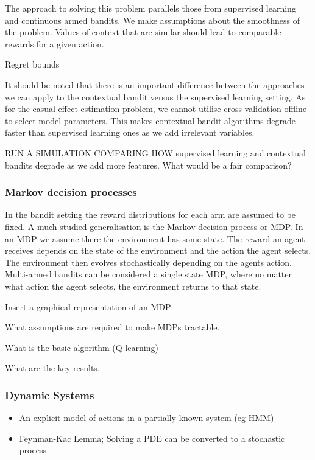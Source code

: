 \documentclass[11pt,a4paper,oneside]{book}
\theoremstyle{plain}
\theoremstyle{definition}
\begin{document}
The approach to solving this problem parallels those from supervised learning and continuous armed bandits. We make assumptions about the smoothness of the problem. Values of context that are similar should lead to comparable rewards for a given action. 

Regret bounds  

It should be noted that there is an important difference between the approaches we can apply to the contextual bandit versus the supervised learning setting. As for the casual effect estimation problem, we cannot utilise cross-validation offline to select model parameters. This makes contextual bandit algorithms degrade faster than supervised learning ones as we add irrelevant variables. 

RUN A SIMULATION COMPARING HOW supervised learning and contextual bandits degrade as we add more features. What would be a fair comparison?

\subsubsection{Markov decision processes}
In the bandit setting the reward distributions for each arm are assumed to be fixed. A much studied generalisation is the Markov decision process or MDP. In an MDP we assume there the environment has some state. The reward an agent receives depends on the state of the environment and the action the agent selects. The environment then evolves stochastically depending on the agents action. Multi-armed bandits can be considered a single state MDP, where no matter what action the agent selects, the environment returns to that state. 

Insert a graphical representation of an MDP

What assumptions are required to make MDPs tractable. 

What is the basic algorithm (Q-learning)

What are the key results.

\subsubsection{Dynamic Systems}
\begin{itemize}
\item An explicit model of actions in a partially known system (eg HMM)
\item Feynman-Kac Lemma; Solving a PDE can be converted to a stochastic process
\end{itemize}
\end{document}
